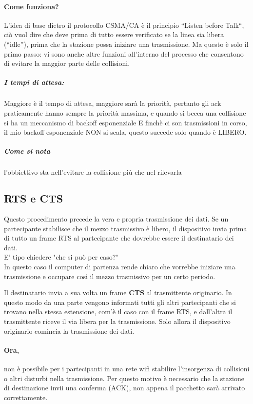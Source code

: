 \documentclass[12pt, a4paper, openany, twoside]{book}
\begin{document}
\paragraph{Come funziona? }L’idea di base dietro il protocollo CSMA/CA è il 
principio “Listen before Talk“, ciò vuol dire che deve prima di tutto essere 
verificato se la linea sia libera (“idle”), prima che la stazione possa
iniziare una trasmissione. Ma questo è solo il primo passo: vi sono anche 
altre funzioni all’interno del processo che consentono di evitare la maggior
parte delle collisioni.	
\subparagraph{I tempi di attesa: }Maggiore è il tempo di attesa, maggiore sarà
la priorità, pertanto gli ack praticamente hanno sempre la priorità massima, e
quando si becca una collisione si ha un meccanismo di backoff esponenziale E
finchè ci son trasmissioni in corso, il mio backoff esponenziale NON si scala,
questo succede solo quando è LIBERO.
\subparagraph{Come si nota} l'obbiettivo sta nell'evitare la collisione più che
nel rilevarla
\subsection{RTS e CTS}
Questo procedimento precede la vera e propria trasmissione dei dati. Se un
partecipante stabilisce che il mezzo trasmissivo è libero, il dispositivo 
invia prima di tutto un frame RTS al partecipante che dovrebbe essere il 
destinatario dei dati. 
\\
E' tipo chiedere "che si può per caso?" 
\\
In questo caso il computer di partenza rende chiaro che
vorrebbe iniziare una trasmissione e occupare così il mezzo trasmissivo per un 
certo periodo.		

Il destinatario invia a sua volta un frame \textbf{CTS} al trasmittente originario. In 
questo modo da una parte vengono informati tutti gli altri partecipanti che si
trovano nella stessa estensione, com’è il caso con il frame RTS, e dall’altra 
il trasmittente riceve il via libera per la trasmissione. Solo allora il dispositivo
originario comincia la trasmissione dei dati. 

\paragraph{Ora, } non è possibile per i 
partecipanti in una rete wifi stabilire l’insorgenza di collisioni o 
altri disturbi nella trasmissione. Per questo motivo è necessario che la stazione 
di destinazione invii una conferma (ACK), non appena il pacchetto sarà arrivato
correttamente.
\end{document}
